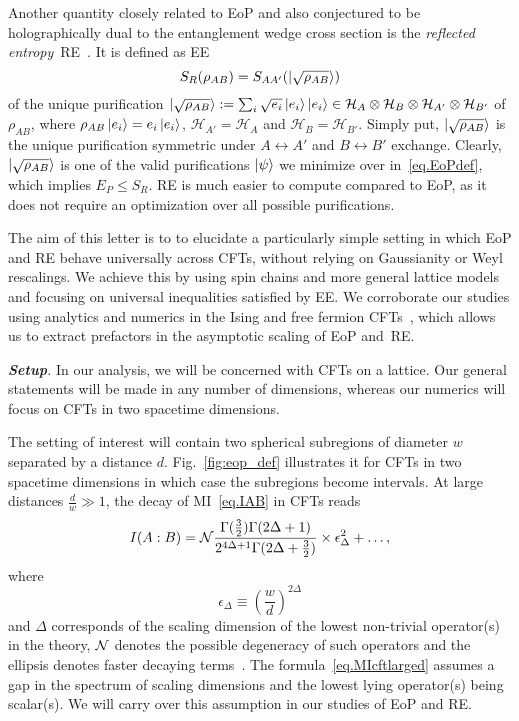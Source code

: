 \documentclass[prl,a4paper,notitlepage,twocolumn,superscriptaddress,longbibliography,reprint]{revtex4-2}
\newcommand{\mysection}[1]{{\vspace{10 pt}\noindent \emph{{\textbf{#1}}.}}}
\begin{document}
Another quantity closely related to EoP and also conjectured to be holographically dual to the entanglement wedge cross section is the \emph{reflected entropy}~RE~\cite{BabaeiVelni:2019pkw,Bao:2019zqc,Chu:2019etd,Dutta:2019gen,Kusuki:2019zsp,Jeong:2019xdr,Bueno:2020vnx,Bueno:2020fle,Zou:2020bly,Li:2020ceg,Kudler-Flam:2020url}. It is defined as EE
\begin{equation}
\label{eq.SRdef}
S_{R}(\rho_{AB}) = S_{AA'}(\ket{\sqrt{\rho_{AB}}}) 
\end{equation}
of the unique purification $\ket{\sqrt{\rho_{AB}}}:=\sum_i \sqrt{e_i}\ket{e_i}\ket{e_i}\in\mathcal{H}_A\otimes\mathcal{H}_B\otimes\mathcal{H}_{A'}\otimes\mathcal{H}_{B'}$ of $\rho_{AB}$, where  $\rho_{AB}\ket{e_i}=e_i\ket{e_i}$, $\mathcal{H}_{A'}=\mathcal{H}_{A}$ and $\mathcal{H}_{B}=\mathcal{H}_{B'}$. Simply put, $\ket{\sqrt{\rho_{AB}}}$ is the unique purification symmetric under $A\leftrightarrow A'$ and $B\leftrightarrow B'$ exchange. Clearly, $\ket{\sqrt{\rho_{AB}}}$ is one of the valid purifications $\ket{\psi}$ we minimize over in~\eqref{eq.EoPdef}, which implies $E_P\leq S_R$. RE is much easier to compute compared to EoP, as it does not require an optimization over all possible purifications.

The aim of this letter is to to elucidate a particularly simple setting in which EoP and RE behave universally across CFTs, without relying on Gaussianity or Weyl rescalings. We achieve this by using spin chains and more general lattice models and focusing on universal inequalities satisfied by EE. We corroborate our studies using analytics and numerics in the Ising and free fermion CFTs~\cite{DiFrancesco:1997nk}, which allows us to extract prefactors in the asymptotic scaling of EoP and~RE.

\mysection{Setup} In our analysis, we will be concerned with CFTs on a lattice. Our general statements will be made in any number of dimensions, whereas our numerics will focus on CFTs in two spacetime dimensions.

The setting of interest will contain two spherical subregions of diameter $w$ separated by a distance $d$. Fig.~\ref{fig:eop_def} illustrates it for CFTs in two spacetime dimensions in which case the subregions become intervals. At large distances $\frac{d}{w} \gg 1$, the decay of MI~\eqref{eq.IAB} in CFTs reads
\begin{equation}
\label{eq.MIcftlarged}
I(A:B) = {\cal N}\frac{\Gamma(\frac{3}{2})\Gamma(2\Delta + 1)}{2^{4\Delta +1} \Gamma(2\Delta + \frac{3}{2})} \times \epsilon_{\Delta}^2 + \ldots,
\end{equation}
where
\begin{equation}
\epsilon_{\Delta} \equiv \left( \frac{w}{d} \right)^{2 \Delta}
\end{equation}
and $\Delta$ corresponds of the scaling dimension of the lowest non-trivial operator(s) in the theory, $\cal N$ denotes the possible degeneracy of such operators and the ellipsis denotes faster decaying terms~\cite{Calabrese:2010he,Cardy:2013nua,Agon:2015ftl,Ugajin:2016opf}. The formula~\eqref{eq.MIcftlarged} assumes a gap in the spectrum of scaling dimensions and the lowest lying operator(s) being scalar(s). We will carry over this assumption in our studies of EoP and RE.
\end{document}
